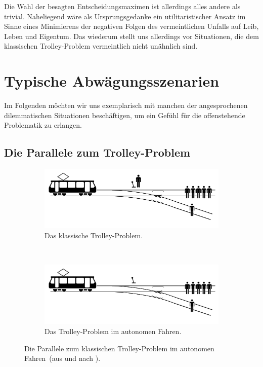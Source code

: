 \documentclass[twocolumn, german]{tum-article}
\begin{document}
Die Wahl der besagten Entscheidungsmaximen ist allerdings alles andere als trivial.
Naheliegend wäre als Ursprungsgedanke ein utilitaristischer Ansatz im Sinne eines Minimierens der negativen Folgen des vermeintlichen Unfalls auf Leib, Leben und Eigentum.
Das wiederum stellt uns allerdings vor Situationen, die dem klassischen Trolley-Problem vermeintlich nicht unähnlich sind.


\section{Typische Abwägungsszenarien}
Im Folgenden möchten wir uns exemplarisch mit manchen der angesprochenen dilemmatischen Situationen beschäftigen, um ein Gefühl für die offenstehende Problematik zu erlangen.


\subsection{Die Parallele zum Trolley-Problem}
\begin{figure}
	\centering
	\begin{subfigure}[t]{0.35\paperwidth}
		\centering
		\includegraphics[width=\textwidth]{media/trolley-img-with}
		\caption{Das klassische Trolley-Problem.}
	\end{subfigure}
	~
	\begin{subfigure}[t]{0.35\paperwidth}
		\centering
		\includegraphics[width=\textwidth]{media/trolley-img-without}
		\caption{Das Trolley-Problem im autonomen Fahren.}
	\end{subfigure}
	\caption{Die Parallele zum klassischen Trolley-Problem im autonomen Fahren~(aus und nach \cite{trolley-img-clean}).}
	\label{fig:trolley-autonomous}
\end{figure}
\end{document}
